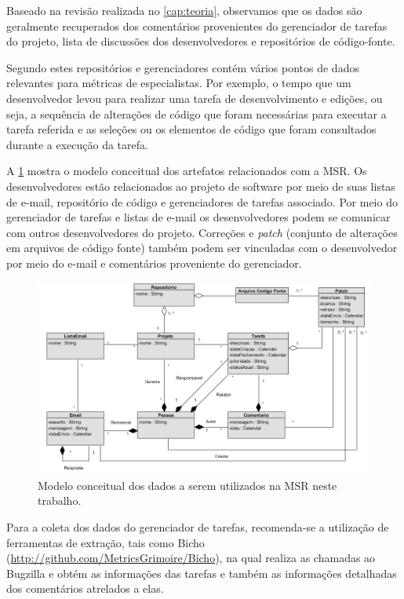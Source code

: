 \documentclass[oneside,brazil,a4paper]{normas-utf-tex}
\begin{document}
Baseado na revisão realizada no \cref{cap:teoria}, observamos que os dados são geralmente recuperados dos comentários provenientes do gerenciador de tarefas do projeto, lista de discussões dos desenvolvedores e repositórios de código-fonte.

Segundo  estes repositórios e gerenciadores contém vários pontos de dados relevantes para métricas de especialistas. Por exemplo, o tempo que um desenvolvedor levou para realizar uma tarefa de desenvolvimento e edições, ou seja, a sequência de alterações de código que foram necessárias para executar a tarefa referida e as seleções ou os elementos de código que foram consultados durante a execução da tarefa.

A \cref{fig:classes} mostra o modelo conceitual dos artefatos relacionados com a MSR. Os desenvolvedores estão relacionados ao projeto de software por meio de suas listas de e-mail, repositório de código e gerenciadores de tarefas associado. Por meio do gerenciador de tarefas e listas de e-mail os desenvolvedores podem se comunicar com outros desenvolvedores do projeto. Correções e \textit{patch} (conjunto de alterações em arquivos de código fonte) também podem ser vinculadas com o desenvolvedor por meio do e-mail e comentários proveniente do gerenciador. 

\begin{figure}[hbt]
    \centering
    \includegraphics[width= .9\textwidth]{figuras/classes}
    \caption{Modelo conceitual dos dados a serem utilizados na MSR neste trabalho.}
    \label{fig:classes}
\end{figure}

Para a coleta dos dados do gerenciador de tarefas, recomenda-se a utilização de ferramentas de extração, tais como Bicho (\url{http://github.com/MetricsGrimoire/Bicho}), na qual realiza as chamadas ao Bugzilla e obtém as informações das tarefas e também as informações detalhadas dos comentários atrelados a elas.
\end{document}
